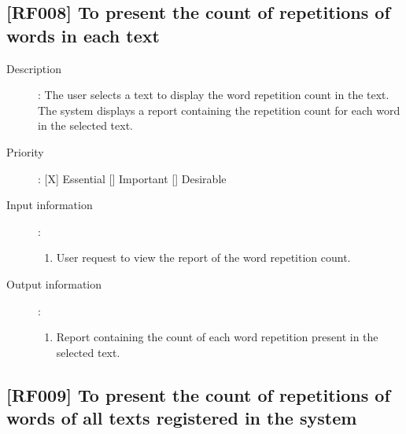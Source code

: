 \documentclass[11pt, twoside, a4paper]{book}
\begin{document}
			\subsection{[RF008] To present the count of repetitions of words in each text}
				
				\begin{description}

					\item[Description]: The user selects a text to display the word repetition count in the text. The system displays a report containing the repetition count for each word in the selected text.
					\item[Priority]: [X] Essential [] Important [] Desirable
					\item[Input information]:
						\begin{enumerate}

							\item User request to view the report of the word repetition count.
							
						\end{enumerate}
					\item[Output information]:
						\begin{enumerate}

							\item Report containing the count of each word repetition present in the selected text.
																					
						\end{enumerate}
	
				\end{description}

			\subsection{[RF009] To present the count of repetitions of words of all texts registered in the system}
				
\end{document}
